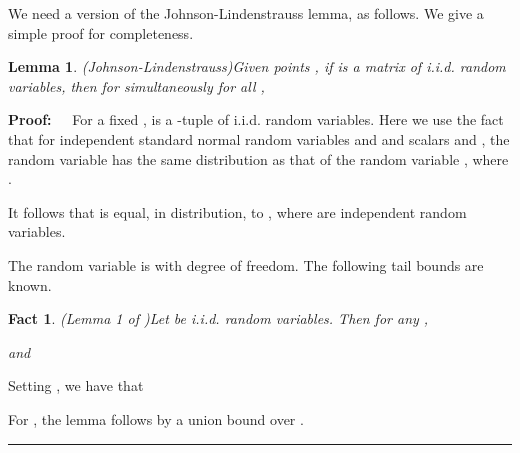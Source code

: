 \documentclass[11pt]{article}
\newtheorem{lemma}[theorem]{Lemma}
\newenvironment{proof}{\begin{trivlist} \item {\bf Proof:~~}}
  {\qed\end{trivlist}}
\def\qed{\hfill\rule{2mm}{2mm}}
\newtheorem{fact}{Fact}
\begin{document}
We need a version of the Johnson-Lindenstrauss lemma, as follows. We give a simple proof for completeness.
\begin{lemma}(Johnson-Lindenstrauss)\label{lem:jl}
Given  points , if  is a  matrix of i.i.d.  random 
variables, then for  simultaneously for all ,

\end{lemma}
\begin{proof}
For a fixed ,  is a -tuple of i.i.d.  random variables. Here we use
the fact that for independent standard normal random variables  and  and scalars  and , 
the random variable  has the same distribution as that of the random variable 
, where . 

It follows that   
is equal, in distribution, to , where  are independent 
random variables. 

The random variable  is  with  degree of freedom. The following tail bounds are known.
\begin{fact}(Lemma 1 of \cite{lm00})\label{fact:c2}
Let  be i.i.d.  random variables. Then for any ,

and

\end{fact}
Setting , we have that

For , the lemma follows by a union bound over .
\end{proof}
\end{document}
